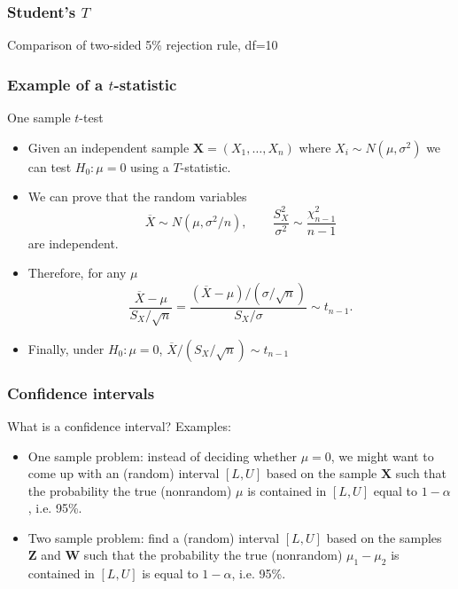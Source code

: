 \documentclass[handout]{beamer}
\begin{document}
   \begin{frame}
   \frametitle{Student's $T$}
   \begin{center}
   \end{center}
   Comparison of two-sided {\color{blue} 5\% rejection rule}, df=10
   \end{frame}


   \begin{frame} \frametitle{Example of a $t$-statistic}

   \begin{block}
   {One sample $t$-test}
   \begin{itemize}

   \item Given an independent sample $\pmb{X}=(X_1, \dots, X_n)$ where $X_i\sim N(\mu,\sigma^2)$ we can test $H_0:\mu=0$ using a $T$-statistic.

   \item We can prove that the random variables
   $$\overline{X} \sim N(\mu, \sigma^2/n), \qquad \frac{S^2_X}{\sigma^2} \sim \frac{\chi^2_{n-1}}{n-1}$$
   are independent.

   \item Therefore, for any $\mu$
   $$
   \frac{\overline{X} - \mu}{S_X / \sqrt{n}} = \frac{ (\overline{X}-\mu) / (\sigma/\sqrt{n})}{S_X / \sigma} \sim t_{n-1}.$$
   \item Finally, under $H_0:\mu=0$, $\overline{X}/(S_X/\sqrt{n}) \sim t_{n-1}
   $
   \end{itemize}
   \end{block}
   \end{frame}


   \begin{frame} \frametitle{Confidence intervals}

   \begin{block}
   {What is a confidence interval?}
   Examples:
   \begin{itemize}[<+->]
   \item One sample problem: instead of deciding whether $\mu=0$, we might want to come up with an (random) interval $[L,U]$ based on the sample $\pmb{X}$ such that the probability
   the true (nonrandom) $\mu$ is contained in $[L,U]$ equal to $1-\alpha$, i.e. 95\%.
   \item Two sample problem: find a (random) interval $[L,U]$ based on the samples $\pmb{Z}$ and $\pmb{W}$ such that
   the probability the true (nonrandom) $\mu_1-\mu_2$ is contained in $[L,U]$ is equal to $1-\alpha$, i.e. 95\%.
   \end{itemize}
   \end{block}
   \end{frame}
\end{document}
